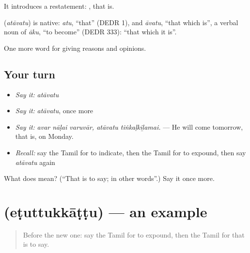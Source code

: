 It introduces a restatement: , that is.

\begin{cousinweb}
\textbf{} (\emph{atāvatu}) is native: \emph{atu}, \textquotedblleft{}that\textquotedblright{} (DEDR 1), and \emph{āvatu}, \textquotedblleft{}that which is\textquotedblright{}, a verbal noun of \emph{āku}, \textquotedblleft{}to become\textquotedblright{} (DEDR 333): \textquotedblleft{}that which it is\textquotedblright{}.
\end{cousinweb}

\begin{grammarlens}[title={What you've built}]
One more word for giving reasons and opinions.
\end{grammarlens}

\subsection*{Your turn}
\begin{itemize}
\raggedright
  \item \emph{Say it:} \emph{atāvatu}
  \item \emph{Say it:} \emph{atāvatu}, once more
  \item \emph{Say it:} \emph{avar nāḷai varuvār, atāvatu tiṅkaḷkiḻamai.} — He will come tomorrow, that is, on Monday.
  \item \emph{Recall:} say the Tamil for to indicate, then the Tamil for to expound, then say \emph{atāvatu} again
\end{itemize}

\begin{tcolorbox}[breakable,colback=teal!4,colframe=teal!35!black,title={Before you move on}]
What does  mean? (\textquotedblleft{}That is to say; in other words\textquotedblright{}.) Say it once more.
\end{tcolorbox}
\section[\texorpdfstring{\ta{எடுத்துக்காட்டு} (eṭuttukkāṭṭu)}{எடுத்துக்காட்டு (eṭuttukkāṭṭu)}]{ (eṭuttukkāṭṭu) — an example}

\label{lesson:TA-C351-etuttukkattu}



\begin{quote}
Before the new one: say the Tamil for to expound, then the Tamil for that is to say.
\end{quote}

